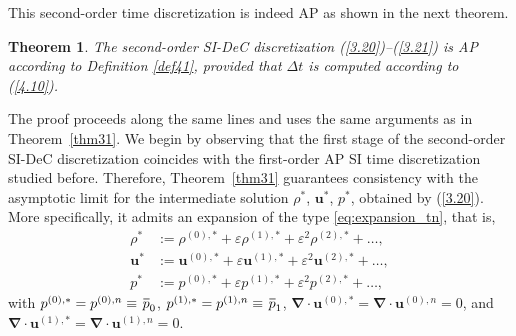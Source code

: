 \documentclass[A4paper,12pt,twoside]{article}
\newtheorem{theorem}{Theorem}[section]
\newenvironment{proof}{{\flushleft \bf Proof:}}{}
\numberwithin{equation}{section}
\numberwithin{figure}{section}
\numberwithin{table}{section}
\def\bnabla{\bm{\nabla}}
\newcommand{\dt}{\Delta t}
\newcommand{\ve}{\varepsilon}
\newcommand\eref[1]{(\ref{#1})}
\newcommand*\xbar[1]{%
  \hbox{%
    \vbox{%
      \hrule height 0.5pt %
      \kern0.4ex%
      \hbox{%
        \kern-0.05em%
        \ensuremath{#1}%
        \kern-0.00em%
      }%
    }%
  }%
}
\begin{document}
This second-order time discretization is indeed AP as shown in the next theorem.
\begin{theorem}
The second-order SI-DeC discretization \eref{3.20}--\eref{3.21} is AP according to Definition \ref{def41}, provided that $\dt$ is computed
according to \eref{4.10}.
\end{theorem}
\begin{proof}
	The proof proceeds along the same lines and uses the same arguments as in Theorem~\ref{thm31}.
	We begin by observing that the first stage of the second-order SI-DeC discretization coincides with the first-order AP SI time discretization studied before. Therefore, 
	Theorem~\ref{thm31} guarantees  consistency with the asymptotic limit for the intermediate solution $\rho^*$, $\bm u^*$, $p^*$, obtained by \eref{3.20}.
	More specifically, it admits an expansion of the type \eqref{eq:expansion_tn}, that is,
	\begin{equation}\label{eq:expansion_tstar}
	\begin{aligned}
		\rho^* &:= \rho^{(0),*} + \varepsilon \rho^{(1),*}
		+ \varepsilon^2 \rho^{(2),*} + \dots, \\
		\bm u^* &:= \bm u^{(0),*} + \varepsilon \bm u^{(1),*}
		+ \varepsilon^2 \bm u^{(2),*} + \dots, \\
		p^* &:= p^{(0),*} + \varepsilon p^{(1),*}
		+ \varepsilon^2 p^{(2),*} + \dots,
	\end{aligned}
	\end{equation}
	with $p^{(0),*}=p^{(0),n}\equiv\,\xbar p_0$, $p^{(1),*}=p^{(1),n}\equiv\,\xbar p_1$, $\bnabla\!\cdot\!\bm u^{(0),*}=\bnabla\!\cdot\!\bm u^{(0),n}=0$, and $\bnabla\!\cdot\!\bm u^{(1),*}=\bnabla\!\cdot\!\bm u^{(1),n}=0$.

\end{proof}
\end{document}

